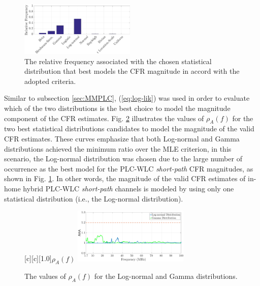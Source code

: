 \documentclass[journal]{IEEEtran}
\begin{document}
\begin{figure}[h!]
	\centering
	\includegraphics[width=0.49\textwidth]{images/MAG_percentsW.eps}
	\caption{The relative frequency associated with the chosen statistical distribution that best models the CFR magnitude in accord with the adopted criteria.}
	\label{MAG_percentsW}
\end{figure}

Similar to subsection \ref{sec:MMPLC}, (\ref{eq:log-lik}) was used in order to evaluate which of the two distributions is the best choice to model the magnitude component of the \ac{CFR} estimates. Fig. \ref{fig:Log_likesW} illustrates the values of  $\rho_{A}(f)$ for the two best statistical distributions candidates to model the magnitude of the valid \ac{CFR} estimates. These curves emphasize that both Log-normal and Gamma distributions achieved the minimum ratio over the \ac{MLE} criterion, in this scenario, the Log-normal distribution was chosen due to the large number of occurrence as the best model for the \ac{PLC}-\ac{WLC} \textit{short-path} \ac{CFR} magnitudes, as shown in Fig. \ref{MAG_percentsW}. In other words, the magnitude of the valid \ac{CFR} estimates of in-home hybrid \ac{PLC}-\ac{WLC} \textit{short-path} channels is modeled by using only one statistical distribution (i.e., the Log-normal distribution).

\begin{figure}[h!]
	\centering
	[c][1.0]{$\rho_{A} (f)$}
	\includegraphics[width=0.49\textwidth]{images/Log_Lognormal_GammasW.eps}
	\caption{The values of $\rho_{A} (f)$ for the Log-normal and Gamma distributions.}
	\label{fig:Log_likesW}
\end{figure}
\end{document}
